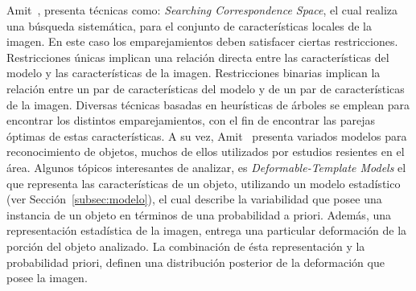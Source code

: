 Amit~\cite{Amit2002}, presenta técnicas como: \textit{Searching Correspondence Space}, el cual realiza una búsqueda sistemática, para el conjunto de características locales de la imagen. En este caso los emparejamientos deben satisfacer ciertas restricciones. Restricciones únicas implican una relación directa entre las características del modelo y las características de la imagen. Restricciones binarias implican la relación entre un par de características del modelo y de un par de características de la imagen. Diversas técnicas basadas en heurísticas de árboles se emplean para encontrar los distintos emparejamientos, con el fin de encontrar las parejas óptimas de estas características. A su vez, Amit~\cite{Amit2002} presenta variados modelos para reconocimiento de objetos, muchos de ellos utilizados por estudios resientes en el área. Algunos tópicos interesantes de analizar, es \textit{Deformable-Template Models} el que representa las características de un objeto, utilizando un modelo estadístico (ver Sección~\ref{subsec:modelo}), el cual describe la variabilidad que posee una instancia de un objeto en términos de una probabilidad a priori. Además, una representación  estadística de la imagen, entrega una particular deformación de la porción del objeto analizado. La combinación de ésta representación y la probabilidad priori, definen una distribución posterior de la deformación que posee la imagen.

